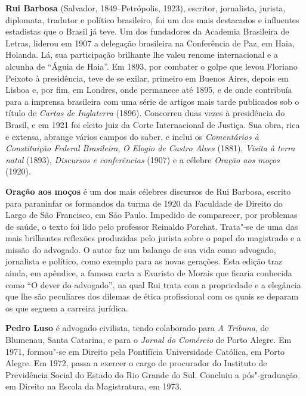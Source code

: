 \textbf{Rui Barbosa} (Salvador, 1849--Petrópolis, 1923), escritor, jornalista, 
jurista, diplomata, tradutor e político brasileiro, foi um dos mais destacados 
e influentes estadistas que o Brasil já teve. Um dos fundadores da Academia 
Brasileira de Letras, liderou em 1907 a delegação brasileira na Conferência 
de Paz, em Haia, Holanda. Lá, sua participação brilhante lhe valeu renome 
internacional e a alcunha de “Águia de Haia”. Em 1893, por combater o golpe 
que levou Floriano Peixoto à presidência, teve de se exilar, primeiro em  
Buenos Aires, depois em Lisboa e, por fim, em Londres, onde permanece até 
1895, e de onde contribuía para a imprensa brasileira com uma série de 
artigos mais tarde publicados sob o título de \textit{Cartas de Inglaterra} 
(1896). Concorreu duas vezes à presidência do Brasil, e em 1921 foi eleito 
juiz da Corte Internacional de Justiça. Sua obra, rica e extensa, abrange 
vários campos do saber, e inclui os \textit{Comentários à Constituição 
Federal Brasileira}, \textit{O Elogio de Castro Alves} (1881), 
\textit{Visita à terra natal} (1893), \textit{Discursos e conferências} 
(1907) e a célebre \textit{Oração aos moços} (1920).

\textbf{Oração aos moços} é um dos mais célebres discursos de Rui
Barbosa, escrito para paraninfar os formandos da
turma de 1920 da Faculdade de Direito do Largo de São Francisco, em São
Paulo. Impedido de comparecer,  por problemas de saúde, o texto foi
lido pelo professor Reinaldo Porchat. Trata"-se de uma das mais
brilhantes reflexões produzidas pelo jurista sobre o papel do
magistrado e a missão do advogado. O autor faz um balanço de sua vida
como advogado, jornalista e político, como exemplo para as novas
gerações. Esta edição traz ainda, em apêndice, a famosa carta
a Evaristo de Morais que ficaria conhecida como ``O dever do advogado'',
na qual Rui trata com a propriedade e a elegância que lhe são peculiares
dos dilemas de ética profissional com os quais se deparam os que 
seguem a carreira jurídica. 



\textbf{Pedro Luso} é advogado civilista, tendo colaborado para \textit{A Tribuna}, 
de  Blumenau, Santa Catarina, e para o \textit{Jornal do Comércio} de Porto Alegre.  
Em 1971, formou"-se em  Direito pela Pontifícia Universidade Católica, 
em Porto Alegre.  Em 1972,  passa a exercer o cargo de procurador do 
Instituto de Previdência  Social do Estado do Rio Grande do Sul.  
Concluiu a pós"-graduação em Direito na Escola da Magistratura, em 1973. 


